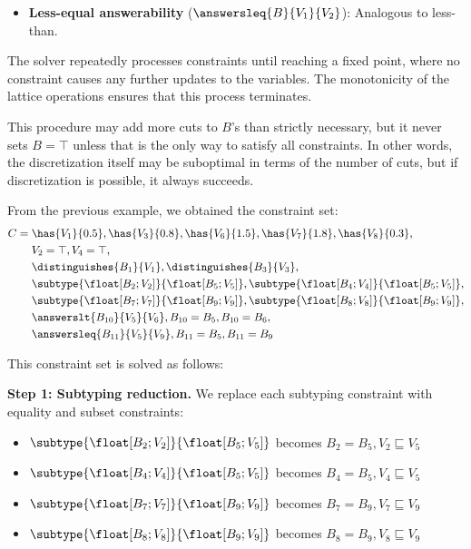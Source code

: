 \begin{itemize}
    \item \textbf{Less-equal answerability} ($\answersleq{B}{V_1}{V_2}$): Analogous to less-than.
\end{itemize}

The solver repeatedly processes constraints until reaching a fixed point, where no constraint causes any further updates to the variables. The monotonicity of the lattice operations ensures that this process terminates.

This procedure may add more cuts to $B$'s than strictly necessary, but it never sets $B=\top$ unless that is the only way to satisfy all constraints. In other words, the discretization itself may be suboptimal in terms of the number of cuts, but if discretization is possible, it always succeeds.

\begin{example}
    From the previous example, we obtained the constraint set:
    \begin{align*}
    C = &\; \has{V_1}{0.5}, \has{V_3}{0.8}, \has{V_6}{1.5}, \has{V_7}{1.8}, \has{V_8}{0.3}, \\
        &\; V_2 = \top, V_4 = \top, \\
        &\; \distinguishes{B_1}{V_1}, \distinguishes{B_3}{V_3}, \\
        &\; \subtype{\float[B_2; V_2]}{\float[B_5; V_5]}, \subtype{\float[B_4; V_4]}{\float[B_5; V_5]}, \\
        &\; \subtype{\float[B_7; V_7]}{\float[B_9; V_9]}, \subtype{\float[B_8; V_8]}{\float[B_9; V_9]}, \\
        &\; \answerslt{B_{10}}{V_5}{V_6}, B_{10} = B_5, B_{10} = B_6, \\
        &\; \answersleq{B_{11}}{V_5}{V_9}, B_{11} = B_5, B_{11} = B_9
    \end{align*}

    This constraint set is solved as follows:

    \textbf{Step 1: Subtyping reduction.} We replace each subtyping constraint with equality and subset constraints:
    \begin{itemize}
        \item $\subtype{\float[B_2; V_2]}{\float[B_5; V_5]}$ becomes $B_2 = B_5, V_2 \sqsubseteq V_5$
        \item $\subtype{\float[B_4; V_4]}{\float[B_5; V_5]}$ becomes $B_4 = B_5, V_4 \sqsubseteq V_5$
        \item $\subtype{\float[B_7; V_7]}{\float[B_9; V_9]}$ becomes $B_7 = B_9, V_7 \sqsubseteq V_9$
        \item $\subtype{\float[B_8; V_8]}{\float[B_9; V_9]}$ becomes $B_8 = B_9, V_8 \sqsubseteq V_9$
    \end{itemize}


\end{example}
